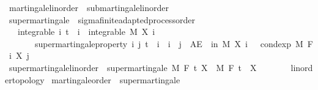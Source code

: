 \begin{isabellebody}
\endisatagproof
{\isafoldproof}%
%
\isadelimproof
%
\endisadelimproof
\isanewline
{}\isamarkupfalse%
\ martingale{\isacharunderscore}{\kern0pt}linorder\ {\isasymsubseteq}\ submartingale{\isacharunderscore}{\kern0pt}linorder%
\isadelimproof
\ %
\endisadelimproof
%
\isatagproof
\isacommand{{\isachardot}{\kern0pt}{\isachardot}{\kern0pt}}\isamarkupfalse%
%
\endisatagproof
{\isafoldproof}%
%
\isadelimproof
%
\endisadelimproof
%
\isadelimdocument
%
\endisadelimdocument
%
\isatagdocument
%
\isamarkuptrue%
%
\endisatagdocument
{\isafolddocument}%
%
\isadelimdocument
%
\endisadelimdocument
{}\isamarkupfalse%
\ supermartingale\ {\isacharequal}{\kern0pt}\ sigma{\isacharunderscore}{\kern0pt}finite{\isacharunderscore}{\kern0pt}adapted{\isacharunderscore}{\kern0pt}process{\isacharunderscore}{\kern0pt}order\ {\isacharplus}{\kern0pt}\isanewline
\ \ \ integrable{\isacharcolon}{\kern0pt}\ {\isachardoublequoteopen}{\isasymAnd}i{\isachardot}{\kern0pt}\ t\ {\isasymle}\ i\ {\isasymLongrightarrow}\ integrable\ M\ {\isacharparenleft}{\kern0pt}X\ i{\isacharparenright}{\kern0pt}{\isachardoublequoteclose}\isanewline
\ \ \ \ \ \ \ supermartingale{\isacharunderscore}{\kern0pt}property{\isacharcolon}{\kern0pt}\ {\isachardoublequoteopen}{\isasymAnd}i\ j{\isachardot}{\kern0pt}\ t\ {\isasymle}\ i\ {\isasymLongrightarrow}\ i\ {\isasymle}\ j\ {\isasymLongrightarrow}\ AE\ {\isasymxi}\ in\ M{\isachardot}{\kern0pt}\ X\ i\ {\isasymxi}\ {\isasymge}\ cond{\isacharunderscore}{\kern0pt}exp\ M\ {\isacharparenleft}{\kern0pt}F\ i{\isacharparenright}{\kern0pt}\ {\isacharparenleft}{\kern0pt}X\ j{\isacharparenright}{\kern0pt}\ {\isasymxi}{\isachardoublequoteclose}\isanewline
\isanewline
{}\isamarkupfalse%
\ supermartingale{\isacharunderscore}{\kern0pt}linorder\ {\isacharequal}{\kern0pt}\ supermartingale\ M\ F\ t\ X\ \ M\ F\ t\ \ X\ {\isacharcolon}{\kern0pt}{\isacharcolon}{\kern0pt}\ {\isachardoublequoteopen}{\isacharunderscore}{\kern0pt}\ {\isasymRightarrow}\ {\isacharunderscore}{\kern0pt}\ {\isasymRightarrow}\ {\isacharunderscore}{\kern0pt}\ {\isacharcolon}{\kern0pt}{\isacharcolon}{\kern0pt}\ {\isacharbraceleft}{\kern0pt}linorder{\isacharunderscore}{\kern0pt}topology{\isacharbraceright}{\kern0pt}{\isachardoublequoteclose}\isanewline
\isanewline
{}\isamarkupfalse%
\ martingale{\isacharunderscore}{\kern0pt}order\ {\isasymsubseteq}\ supermartingale%

\end{isabellebody}
